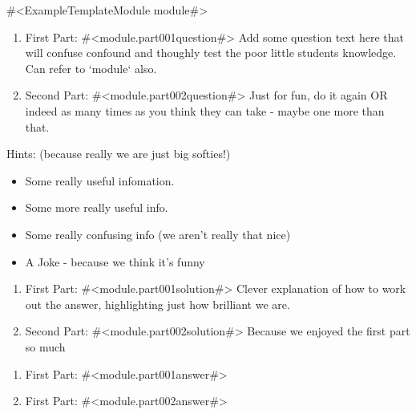 

#<ExampleTemplateModule module#>
\begin{enumerate}
\item   First Part: #<module.part001question#>
        Add some question text here that will confuse 
        confound and thoughly test the poor little students
        knowledge. Can refer to `module` also.
\item   Second Part: #<module.part002question#>
        Just for fun, do it again OR indeed as many times
        as you think they can take - maybe one more than
        that.
\end{enumerate}
Hints: (because really we are just big softies!)
\begin{itemize}
\item   Some really useful infomation.
\item   Some more really useful info.
\item   Some really confusing info (we aren't really that nice)
\item   A Joke - because we think it's funny
\end{itemize}
\begin{enumerate}
\item   First Part: #<module.part001solution#>
        Clever explanation of how to work out the answer,
        highlighting just how brilliant we are.
\item   Second Part: #<module.part002solution#>
        Because we enjoyed the first part so much
\end{enumerate}
\begin{enumerate}
\item   First Part: #<module.part001answer#>
\item   First Part: #<module.part002answer#>
\end{enumerate}


